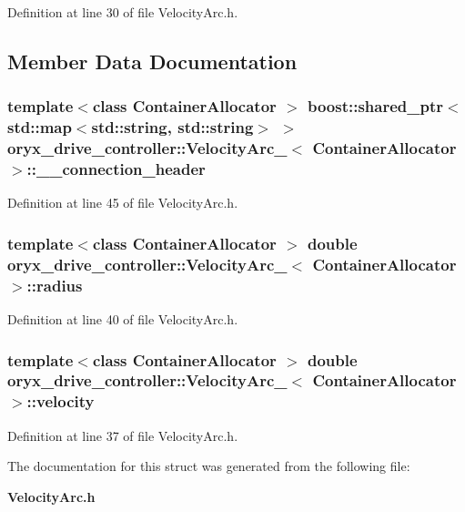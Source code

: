 \-Definition at line 30 of file \-Velocity\-Arc.\-h.



\subsection{\-Member \-Data \-Documentation}
\subsubsection[{\-\_\-\-\_\-connection\-\_\-header}]{\setlength{\rightskip}{0pt plus 5cm}template$<$class Container\-Allocator $>$ boost\-::shared\-\_\-ptr$<$std\-::map$<$std\-::string, std\-::string$>$ $>$ {\bf oryx\-\_\-drive\-\_\-controller\-::\-Velocity\-Arc\-\_\-}$<$ \-Container\-Allocator $>$\-::{\bf \-\_\-\-\_\-connection\-\_\-header}}\label{structoryx__drive__controller_1_1VelocityArc___a98530af0da8444b1b51014bed4288cd5}


\-Definition at line 45 of file \-Velocity\-Arc.\-h.

\subsubsection[{radius}]{\setlength{\rightskip}{0pt plus 5cm}template$<$class Container\-Allocator $>$ double {\bf oryx\-\_\-drive\-\_\-controller\-::\-Velocity\-Arc\-\_\-}$<$ \-Container\-Allocator $>$\-::{\bf radius}}\label{structoryx__drive__controller_1_1VelocityArc___ae481f7fda330e24a7393eead69a07cce}


\-Definition at line 40 of file \-Velocity\-Arc.\-h.

\subsubsection[{velocity}]{\setlength{\rightskip}{0pt plus 5cm}template$<$class Container\-Allocator $>$ double {\bf oryx\-\_\-drive\-\_\-controller\-::\-Velocity\-Arc\-\_\-}$<$ \-Container\-Allocator $>$\-::{\bf velocity}}\label{structoryx__drive__controller_1_1VelocityArc___aec7a5507b705d736b6426a0ecb1395d8}


\-Definition at line 37 of file \-Velocity\-Arc.\-h.



\-The documentation for this struct was generated from the following file\-:\begin{DoxyCompactItemize}
\item 
{\bf \-Velocity\-Arc.\-h}\end{DoxyCompactItemize}
